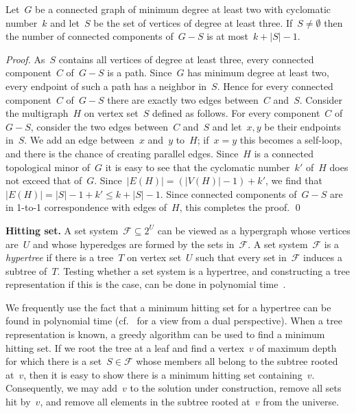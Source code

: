 \let\accentvec\vec  \documentclass{llncs}
\let\SSign\S
\renewcommand{\S}{\ensuremath{\mathcal{S}}\xspace}
\newcommand{\F}{\ensuremath{\mathcal{F}}\xspace}
\begin{document}
\begin{proposition} \label{proposition:numcomponents}
Let~$G$ be a connected graph of minimum degree at least two with cyclomatic number~$k$ and let~$S$ be the set of vertices of degree at least three. If~$S \neq \emptyset$ then the number of connected components of~$G - S$ is at most~$k + |S| - 1$.
\end{proposition}
\begin{proof}
As~$S$ contains all vertices of degree at least three, every connected component~$C$ of~$G - S$ is a path. Since~$G$ has minimum degree at least two, every endpoint of such a path has a neighbor in~$S$. Hence for every connected component~$C$ of~$G - S$ there are exactly two edges between~$C$ and~$S$. Consider the multigraph~$H$ on vertex set~$S$ defined as follows. For every component~$C$ of~$G - S$, consider the two edges between~$C$ and~$S$  and let~$x,y$ be their endpoints in~$S$. We add an edge between~$x$ and~$y$ to~$H$; if~$x=y$ this becomes a self-loop, and there is the chance of creating parallel edges. Since~$H$ is a connected topological minor of~$G$ it is easy to see that the cyclomatic number~$k'$ of~$H$ does not exceed that of~$G$. Since~$|E(H)| = (|V(H)| - 1) + k'$, we find that~$|E(H)| = |S| - 1 + k' \leq k + |S| - 1$. Since connected components of~$G - S$ are in 1-to-1 correspondence with edges of~$H$, this completes the proof.
\qed
\end{proof}

\textbf{Hitting set.} A set system~$\F \subseteq 2^U$ can be viewed as a hypergraph whose vertices are~$U$ and whose hyperedges are formed by the sets in~$\F$. A set system~$\F$ is a \emph{hypertree} if there is a tree~$T$ on vertex set~$U$ such that every set in~$\F$ induces a subtree of~$T$. Testing whether a set system is a hypertree, and constructing a tree representation if this is the case, can be done in polynomial time~\cite{Trick87}. 

We frequently use the fact that a minimum hitting set for a hypertree can be found in polynomial time (cf.~\cite[\SSign 2]{GuoN06} for a view from a dual perspective). When a tree representation is known, a greedy algorithm can be used to find a minimum hitting set. If we root the tree at a leaf and find a vertex~$v$ of maximum depth for which there is a set~$S \in \F$ whose members all belong to the subtree rooted at~$v$, then it is easy to show there is a minimum hitting set containing~$v$. Consequently, we may add~$v$ to the solution under construction, remove all sets hit by~$v$, and remove all elements in the subtree rooted at~$v$ from the universe.
\end{document}
